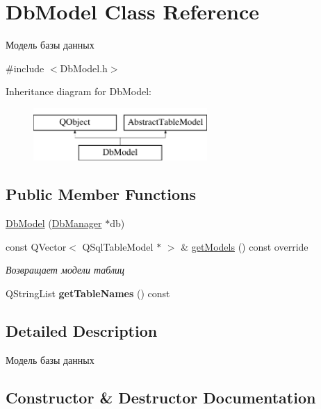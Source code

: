 \hypertarget{class_db_model}{}\section{Db\+Model Class Reference}
\label{class_db_model}


Модель базы данных  




{\ttfamily \#include $<$Db\+Model.\+h$>$}

Inheritance diagram for Db\+Model\+:\begin{figure}[H]
\begin{center}
\leavevmode
\includegraphics[height=2.000000cm]{class_db_model}
\end{center}
\end{figure}
\subsection*{Public Member Functions}
\begin{DoxyCompactItemize}
\item 
\mbox{\hyperlink{class_db_model_ae102f26485df0f84f97132e7f2066771}{Db\+Model}} (\mbox{\hyperlink{class_db_manager}{Db\+Manager}} $\ast$db)
\item 
const Q\+Vector$<$ Q\+Sql\+Table\+Model $\ast$ $>$ \& \mbox{\hyperlink{class_db_model_abc8c110a4d9fa82bbf9cf6152331b645}{get\+Models}} () const override
\begin{DoxyCompactList}\small\item\em Возвращает модели таблиц \end{DoxyCompactList}\item 
\mbox{\label{class_db_model_a383eb537ab1f74f8b1e816e76994a7c2}} 
Q\+String\+List {\bfseries get\+Table\+Names} () const
\end{DoxyCompactItemize}


\subsection{Detailed Description}
Модель базы данных 

\subsection{Constructor \& Destructor Documentation}
\mbox{\label{class_db_model_ae102f26485df0f84f97132e7f2066771}} 
